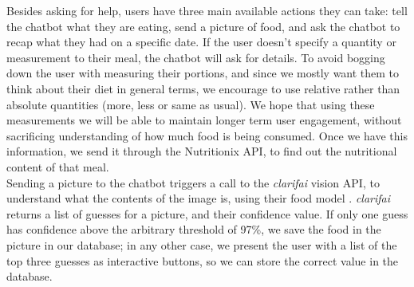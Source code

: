 Besides asking for help, users have three main available actions they can take: tell the chatbot what they are eating, send a picture of food, and ask the chatbot to recap what they had on a specific date. If the user doesn't specify a quantity or measurement to their meal, the chatbot will ask for details. To avoid bogging down the user with measuring their portions, and since we mostly want them to think about their diet in general terms, we encourage to use relative rather than absolute quantities (more, less or same as usual). We hope that using these measurements we will be able to maintain longer term user engagement, without sacrificing understanding of how much food is being consumed. Once we have this information, we send it through the Nutritionix API, to find out the nutritional content of that meal. \\
Sending a picture to the chatbot triggers a call to the \textit{clarifai} vision API, to understand what the contents of the image is, using their food model \cite{clarifaifood}. \textit{clarifai} returns a list of guesses for a picture, and their confidence value. If only one guess has confidence above the arbitrary threshold of 97\%, we save the food in the picture in our database; in any other case, we present the user with a list of the top three guesses as interactive buttons, so we can store the correct value in the database. \\
